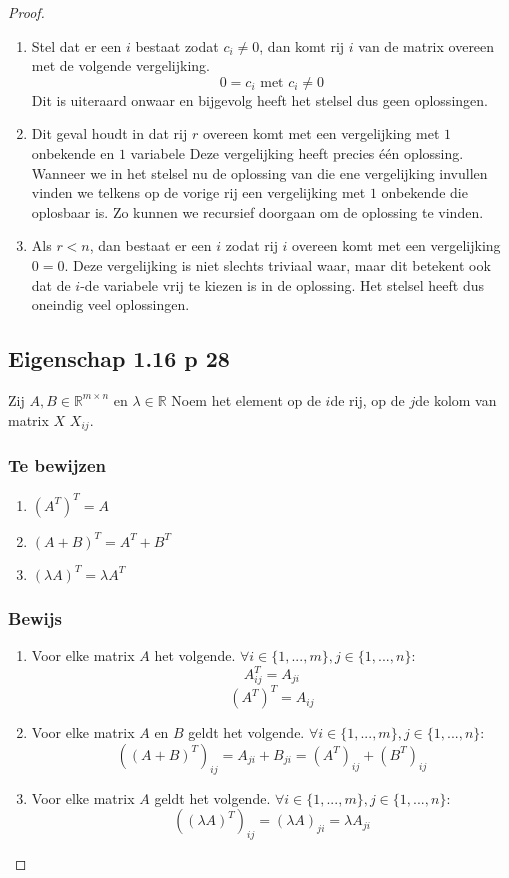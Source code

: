 \documentclass[lineaire_algebra_oplossingen.tex]{subfiles}
\begin{document}
\begin{proof}
\begin{enumerate}
\item Stel dat er een $i$ bestaat zodat $c_i \neq 0$, dan komt rij $i$ van de matrix overeen met de volgende vergelijking.
\[
0 = c_i \text{ met } c_i \neq 0
\]
Dit is uiteraard onwaar en bijgevolg heeft het stelsel dus geen oplossingen.
\item
Dit geval houdt in dat rij $r$ overeen komt met een vergelijking met $1$ onbekende en $1$ variabele
Deze vergelijking heeft precies \'e\'en oplossing.
Wanneer we in het stelsel nu de oplossing van die ene vergelijking invullen vinden we telkens op de vorige rij een vergelijking met $1$ onbekende die oplosbaar is.
Zo kunnen we recursief doorgaan om de oplossing te vinden.
\item
Als $r < n$, dan bestaat er een $i$ zodat rij $i$ overeen komt met een vergelijking $0=0$.
Deze vergelijking is niet slechts triviaal waar, maar dit betekent ook dat de $i$-de variabele vrij te kiezen is in de oplossing.
Het stelsel heeft dus oneindig veel oplossingen.
\end{enumerate}


\subsection{Eigenschap 1.16 p 28}
\label{1.16}
Zij $A,B \in \mathbb{R}^{m\times n} $ en $\lambda \in \mathbb{R}$
Noem het element op de $i$de rij, op de $j$de kolom van matrix $X$ $X_{ij}$.

\subsubsection*{Te bewijzen}
\begin{enumerate}
\item $(A^T)^T = A$
\item $(A+B)^T = A^T + B^T$
\item $(\lambda A)^T=\lambda A^T$
\end{enumerate}

\subsubsection*{Bewijs}
\begin{enumerate}
\item Voor elke matrix $A$ het volgende. $\forall i\in \{1,...,m\} ,j \in \{1,...,n\}:$
\[
A^T_{ij} = A_{ji}
\]
\[
(A^T)^T = A_{ij}
\]
\item Voor elke matrix $A$ en $B$ geldt het volgende. $\forall i\in \{1,...,m\} ,j \in \{1,...,n\}:$
\[
((A+B)^T)_{ij} = A_{ji}+B_{ji}= (A^T)_{ij} + (B^T)_{ij}
\]
\item Voor elke matrix $A$ geldt het volgende. $\forall i\in \{1,...,m\} ,j \in \{1,...,n\}:$
\[
((\lambda A)^T)_{ij} = (\lambda A)_{ji} = \lambda A_{ji}
\]
\end{enumerate}
\end{proof}
\end{document}
